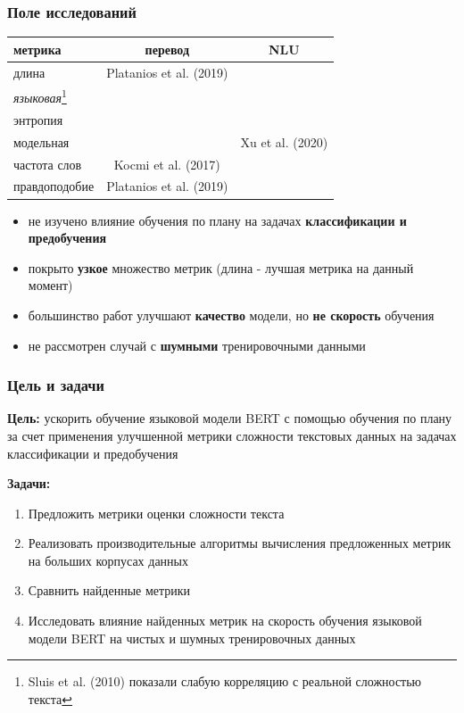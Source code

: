 \documentclass{beamer}
\begin{document}
\begin{frame}
	\frametitle{Поле исследований}
	\begin{table}
		\begin{tabular}{l|cc}
			метрика & перевод & NLU \\
			\hline
			длина & Platanios et al. (2019) & \\
			{\it языковая}\footnote[1]{Sluis et al. (2010) показали слабую корреляцию с реальной сложностью текста} & &\\
			энтропия & &\\
			модельная & & Xu et al. (2020) \\
			частота слов & Kocmi et al. (2017) & \\
			правдоподобие & Platanios et al. (2019) &\\
			\hline
		\end{tabular}
	\end{table}
	\begin{itemize}
		\item не изучено влияние обучения по плану на задачах {\bf классификации и предобучения}
		\item покрыто {\bf узкое} множество метрик (длина - лучшая метрика на данный момент)
		\item большинство работ улучшают {\bf качество} модели, но {\bf не скорость} обучения
		\item не рассмотрен случай с {\bf шумными} тренировочными данными
	\end{itemize}\end{frame}

\begin{frame}
	\frametitle{Цель и задачи}
	{\bf Цель:} ускорить обучение языковой модели BERT с помощью обучения по плану за счет применения улучшенной метрики сложности текстовых данных на задачах классификации и предобучения
	
	{\bf Задачи:}
	\begin{enumerate}
		\item Предложить метрики оценки сложности текста
		\item Реализовать производительные алгоритмы вычисления предложенных метрик на больших корпусах данных
		\item Сравнить найденные метрики
		\item Исследовать влияние найденных метрик на скорость обучения языковой модели BERT на чистых и шумных тренировочных данных
	\end{enumerate}
\end{frame}
\end{document}
